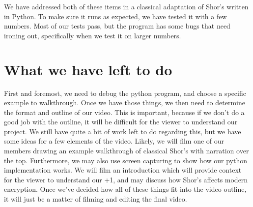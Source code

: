\documentclass[a4paper]{article}
\begin{document}
We have addressed both of these items in a classical adaptation of Shor's
written in Python. To make sure it runs as expected, we have tested it
with a few numbers. Most of our tests pass, but the program has
some bugs that need ironing out, specifically when we test it on larger numbers.


\section{What we have left to do}
First and foremost, we need to debug the python program, and choose a specific example to walkthrough.
Once we have those things, we then need to determine the format and outline of our video.
This is important,
because if we don't do a good job with the outline, it will be difficult for the viewer to understand our project.
We still
have quite a bit of work left to do regarding this, but we have some ideas for a few elements of the video.
Likely, we will film one of
our members drawing an example walkthrough of classical Shor's with narration over the top.
Furthermore, we may also
use screen capturing to show how our python implementation works. We will film an introduction which will provide context for the viewer to understand our +1,
and may discuss how Shor's affects modern encryption. Once we've decided how all of these things fit into the video outline,
it will just be a
matter of filming and editing the final video.

\newpage


\end{document}
